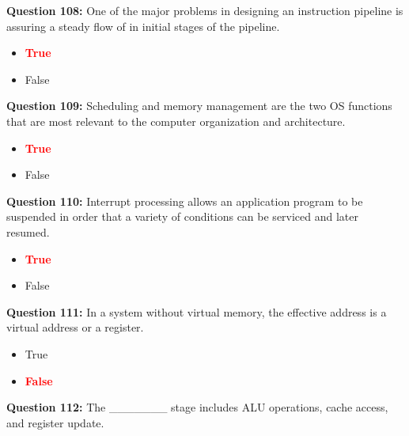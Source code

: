 \documentclass[12pt,a4paper]{article}
\begin{document}
\vspace{0.5cm}

\textbf{Question 108:} One of the major problems in designing an instruction pipeline is assuring a steady flow of in initial stages of the pipeline.

\begin{itemize}
    \item[\textbf{A.}] \textcolor{red}{\textbf{True}}
    \item[\textbf{B.}] False
\end{itemize}

\vspace{0.5cm}

\textbf{Question 109:} Scheduling and memory management are the two OS functions that are most relevant to the computer organization and architecture.

\begin{itemize}
    \item[\textbf{A.}] \textcolor{red}{\textbf{True}}
    \item[\textbf{B.}] False
\end{itemize}

\vspace{0.5cm}

\textbf{Question 110:} Interrupt processing allows an application program to be suspended in order that a variety of conditions can be serviced and later resumed.

\begin{itemize}
    \item[\textbf{A.}] \textcolor{red}{\textbf{True}}
    \item[\textbf{B.}] False
\end{itemize}

\vspace{0.5cm}

\textbf{Question 111:} In a system without virtual memory, the effective address is a virtual address or a register.

\begin{itemize}
    \item[\textbf{A.}] True
    \item[\textbf{B.}] \textcolor{red}{\textbf{False}}
\end{itemize}

\vspace{0.5cm}

\textbf{Question 112:} The _______ stage includes ALU operations, cache access, and register update.
\end{document}
